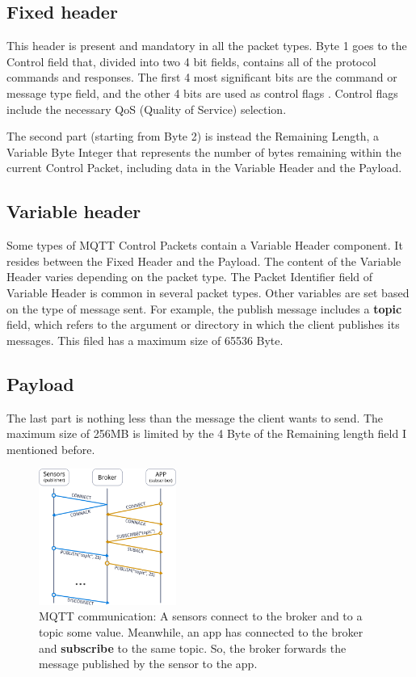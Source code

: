 \documentclass[journal]{IEEEtran}
\begin{document}
\subsection{Fixed header}
This header is present and mandatory in all the packet types. 
Byte 1 goes to the Control field that, divided into two 4 bit fields, contains all of the protocol commands and responses. 
The first 4 most significant bits are the command or message type field, and the other 4 bits are used as control flags \cite{steven}.
Control flags include the necessary QoS (Quality of Service) selection. 

The second part (starting from Byte 2) is instead the Remaining Length, a Variable Byte Integer that represents the number of bytes remaining within the current Control Packet, including data in the Variable Header and the Payload.
\subsection{Variable header}
Some types of MQTT Control Packets contain a Variable Header component. It resides between the Fixed Header and the Payload. 
The content of the Variable Header varies depending on the packet type. The Packet Identifier field of Variable Header is common in several packet types. Other variables are set based on the type of message sent. 
For example, the publish message includes a \textbf{topic} field, which refers to the argument or directory in which the client publishes its messages. This filed has a maximum size of 65536 Byte. 

\subsection{Payload}
The last part is nothing less than the message the client wants to send. The maximum size of 256MB is limited by the 4 Byte of the Remaining length field I mentioned before. 

\begin{figure}[h]
	\centering
	\includegraphics[width=0.4\textwidth]{mqtt}
	\caption{MQTT communication: A sensors connect to the broker and  to a topic some value. Meanwhile, an app has connected to the broker and \textbf{subscribe} to the same topic. So, the broker forwards the message published by the sensor to the app.}
	\label{fig:flow}
\end{figure}
\end{document}
